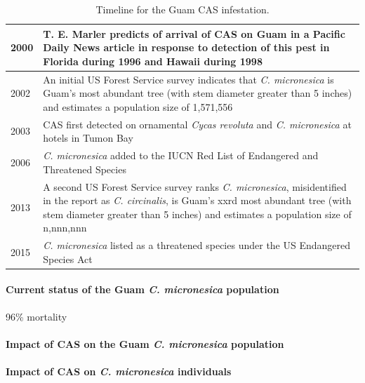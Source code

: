 \documentclass[12pt,letterpaper,english,bibliography=totocnumbered, abstract=on]{scrartcl}
\begin{document}
\begin{table}[H]
	\centering
	\label{tab:timeline}	
	\caption{Timeline for the Guam CAS infestation.}	
	\begin{tabular}{l>{\raggedright\arraybackslash}p{4.5in}}
		\hline
		2000 & T. E. Marler predicts of arrival of CAS on Guam in a Pacific Daily News article \parencite{haynesExoticInvasivePest2005} in response to detection of this pest in Florida during 1996 \parencite{howardAulacaspisYasumatsuiHemiptera1999a} and Hawaii during 1998 \parencite{heu2003sago}
		\\\hline
		2002 & An initial US Forest Service survey indicates that \textit{C. micronesica} is Guam's most abundant tree (with stem diameter greater than 5 inches) and estimates a population size of 1,571,556 \parencite{donnegon_guams_2004}
		\\\hline
		2003 & CAS first detected on ornamental \textit{Cycas revoluta} and \textit{C. micronesica} at hotels in Tumon Bay
		\\\hline
		2006 & \textit{C. micronesica} added to the IUCN Red List of Endangered and Threatened Species
		\\\hline
		2013 & A second US Forest Service survey ranks \textit{C. micronesica}, misidentified in the report as \textit{C. circinalis}, is Guam's xxrd most abundant tree (with stem diameter greater than 5 inches) and estimates a population size of n,nnn,nnn \parencite{lazaroGuamForestResources2020a}
		\\\hline
		2015 & \textit{C. micronesica} listed as a threatened species under the US Endangered Species Act \parencite{unitedstatesgovernmentEndangeredThreatenedWildlife2015}
		\\\hline
	\end{tabular}	
\end{table}

\paragraph{Current status of the Guam \textit{C. micronesica} population}
	
96\% mortality \parencite{marlerLongitudeForestFragmentation2020}

\paragraph{Impact of CAS on the Guam \textit{C. micronesica} population}

\paragraph{Impact of CAS on \textit{C. micronesica} individuals}
\end{document}
